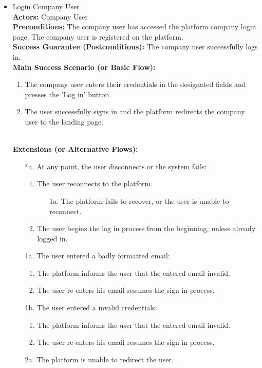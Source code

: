 \begin{itemize}[label={[\textbf{UC}]}, align=left, leftmargin=*]
     
     \item {} Login Company User \\
     \textbf{Actors:} Company User\\
     \textbf{Preconditions:} The company user has accessed the platform company login page. The company user is registered on the platform.\\
     \textbf{Success Guarantee (Postconditions):} The company user successfully logs in. \\
     \textbf{Main Success Scenario (or Basic Flow):} 
     \begin{enumerate}[label=\arabic*.] 
        \item The company user enters their credentials in the designated fields and presses the 'Log in' button.
        \item The user successfully signs in and the platform redirects the company user to the landing page.
     \end{enumerate} \\

    \textbf{Extensions (or Alternative Flows):} 
    \begin{enumerate}[label=\arabic*.]
        \item[*a.] At any point, the user disconnects or the system fails:
            \begin{enumerate}[label=\arabic*.]
                \item The user reconnects to the platform.
                    \begin{enumerate}[label=\alph*.]
                        \item[1a.] The platform fails to recover, or the user is unable to reconnect.
                    \end{enumerate}
                 \item The user begins the log in process from the beginning, unless already logged in.
            \end{enumerate}
        \item[1a.] The user entered a badly formatted email:
            \begin{enumerate}[label=\arabic*.]
                \item The platform informs the user that the entered email invalid.
                \item The user re-enters his email resumes the sign in process.
            \end{enumerate}
        \item[1b.] The user entered a invalid credentials:
            \begin{enumerate}[label=\arabic*.]
                \item The platform informs the user that the entered email invalid.
                \item The user re-enters his email resumes the sign in process.
            \end{enumerate}
        \item[2a.] The platform is unable to redirect the user.
        \end{enumerate}
        

\end{itemize}
